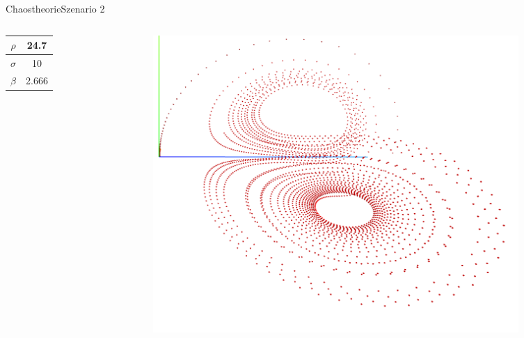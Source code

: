 \documentclass[presentation.tex]{subfiles}
\begin{document}
    \begin{frame}{Chaostheorie}{Szenario 2}
    	\begin{columns}[T]
    		\begin{column}{.5\textwidth}
    			\begin{table}
    				\begin{tabular}{ | c | c |}
    					\hline
    					$ \rho $ & 24.7 \\\hline
    					$ \sigma $ & 10 \\\hline
    					$ \beta $ & 2.666 \\\hline
    				\end{tabular}
    			\end{table}
    		\end{column}
    		\begin{column}{.5\textwidth}
    			\includegraphics[width=\textwidth]{Chaostheorie2}
    		\end{column}
    	\end{columns}
    \end{frame}
\end{document}

